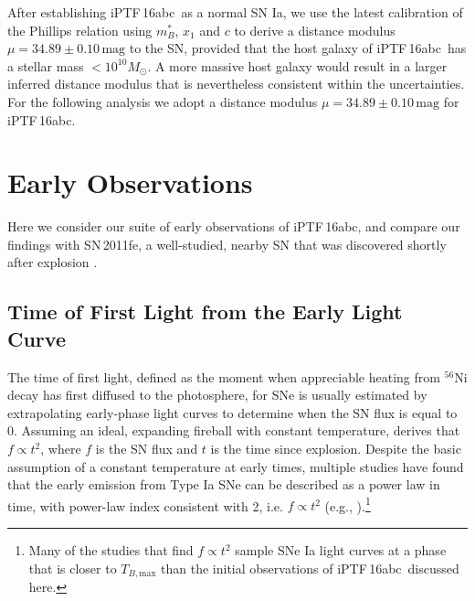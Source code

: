 \documentclass[twocolumn]{aastex61}
\newcommand{\sm}{M_\odot}
\newcommand{\abc}{iPTF\,16abc}
\begin{document}
After establishing \abc\ as a normal SN Ia, we use the latest
calibration \citep{2014A&A...568A..22B} of the Phillips relation
\citep{1993ApJ...413L.105P} using $m^*_{B}$, $x_1$ and $c$ to derive a distance modulus $\mu = 34.89 \pm 0.10 \,\textrm{mag}$ to the SN, provided that the host galaxy of \abc\ has a stellar mass $< 10^{10}\sm$. A more massive host galaxy would result in a larger inferred distance modulus that is nevertheless consistent within the uncertainties. For the following analysis we adopt a distance modulus $\mu = 34.89 \pm 0.10 \,\textrm{mag}$ for \abc.

\section{Early Observations}
\label{sec:first_light}

Here we consider our suite of early observations of \abc, and compare our findings with SN\,2011fe, a well-studied, nearby SN that was discovered shortly after explosion \citep{2011Natur.480..344N,2012ApJ...744L..17B,2014ApJ...784...85P}. 

\subsection{Time of First Light from the Early Light Curve}
\label{sec:lc_fit}

The time of first light, defined as the moment when appreciable heating from $^{56}$Ni decay has first diffused to the photosphere, for SNe is usually estimated by 
extrapolating early-phase light curves to determine when the 
SN flux is equal to 0. Assuming an ideal, expanding fireball with 
constant temperature, \citet{1982ApJ...253..785A} derives that $f 
\propto t^2$, where $f$ is the SN flux and $t$ is the time since 
explosion. Despite the basic assumption of a constant temperature at 
early times, multiple studies have found that the early emission 
from Type Ia SNe can be described as a power law in time, with 
power-law index consistent with 2, i.e. $f \propto t^2$ (e.g., \citealt{2006AJ....132.1707C, 2010ApJ...712..350H, 2011MNRAS.416.2607G}).\footnote{Many of the studies that find $f \propto t^2$ sample SNe Ia light curves at a phase that is closer to $T_{B,\mathrm{max}}$ than the initial observations of \abc\ discussed here.}
\end{document}
